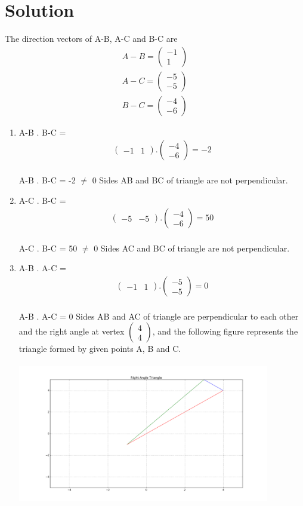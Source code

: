 \documentclass[journal,12pt,twocolumn]{IEEEtran}
\newcommand{\myvec}[1]{\ensuremath{\begin{pmatrix}#1\end{pmatrix}}}
\begin{document}
\section{Solution}
The direction vectors of A-B, A-C and B-C are
\begin{align}
	A-B=\myvec{-1 \\ 1} \\
	A-C=\myvec{-5 \\ -5}\\
	B-C=\myvec{-4 \\ -6} 
\end{align}
\begin{enumerate}
\item A-B . B-C = \begin{align} \myvec{ -1 & 1 } . \myvec{ -4 \\ -6 } = -2\end{align}\\
A-B . B-C = -2 $\neq$ 0
Sides AB and BC of triangle are not perpendicular.

\item A-C . B-C = \begin{align} \myvec{ -5 & -5 } . \myvec{ -4 \\ -6 } = 50\end{align}\\
A-C . B-C = 50 $\neq$ 0 
Sides AC and BC of triangle are not perpendicular.

\item A-B . A-C = \begin{align} \myvec{ -1 & 1 } . \myvec{ -5 \\ -5 } = 0\end{align}\\
A-B . A-C = 0 
Sides AB and AC of triangle are perpendicular to each other and the right angle at vertex \myvec{ 4 \\ 4 }, and the following figure represents the triangle formed by given points A, B and C.  
\includegraphics[width=11cm, height=7cm]{vihi}
\end{enumerate}
\end{document}
